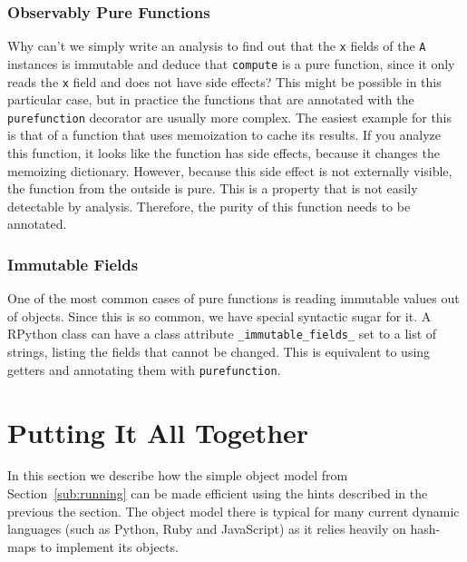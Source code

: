 \documentclass{sigplanconf}
\begin{document}
\subsubsection{Observably Pure Functions}

Why can't we simply write an analysis to find out that the \texttt{x} fields of the
\texttt{A} instances is immutable and deduce that \texttt{compute} is a pure function,
since it only reads the \texttt{x} field and does not have side effects? This might
be possible in this particular case, but in practice the functions that are
annotated with the \texttt{purefunction} decorator are usually more complex.
The easiest example for this is that of a function that uses memoization to
cache its results. If you analyze this function, it looks like the function has
side effects, because it changes the memoizing dictionary. However, because this side
effect is not externally visible, the function from the outside is pure. This is
a property that is not easily detectable by analysis. Therefore, the purity
of this function needs to be annotated.



\subsubsection{Immutable Fields}

One of the most common cases of pure functions is reading immutable
values out of objects. Since this is so common, we have special syntactic sugar
for it. A RPython class can have a class attribute \texttt{\_immutable\_fields\_} set to
a list of strings, listing the fields that cannot be changed. This is equivalent
to using getters and annotating them with \texttt{purefunction}.





\section{Putting It All Together}
\label{sec:fastobjmodel}

In this section we describe how the simple object model from
Section~\ref{sub:running} can be made efficient using the hints described in the
previous the section. The object model there is typical for many current
dynamic languages (such as Python, Ruby and JavaScript) as it relies heavily on
hash-maps to implement its objects.
\end{document}
